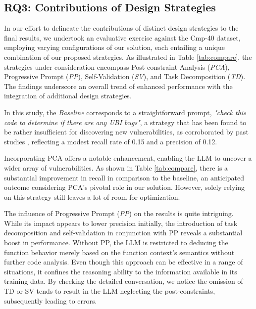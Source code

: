 \subsection{RQ3: Contributions of Design Strategies}
\label{sec:comparison}

In our effort to delineate the contributions of distinct design strategies to the final results, we undertook an evaluative exercise against the Cmp-40 dataset, employing varying configurations of our solution, each entailing a unique combination of our proposed strategies. As illustrated in Table \ref{tab:compare}, the strategies under consideration encompass Post-constraint Analysis (\textit{PCA}), Progressive Prompt (\textit{PP}), Self-Validation (\textit{SV}), and Task Decomposition (\textit{TD}). The findings underscore an overall trend of enhanced performance with the integration of additional design strategies.

In this study, the \textit{Baseline} corresponds to a straightforward prompt, \textit{"check this code to determine if there are any UBI bugs"}, a strategy that has been found to be rather insufficient for discovering new vulnerabilities, as corroborated by past studies \cite{openai_2023_gpt_4, ma_scope_2023, tian_is_2023}, reflecting a modest recall rate of 0.15 and a precision of 0.12.


Incorporating PCA offers a notable enhancement, enabling the LLM to uncover a wider array of vulnerabilities. As shown in Table \ref{tab:compare}, there is a substantial improvement in recall in comparison to the baseline, an anticipated outcome considering PCA's pivotal role in our solution. However, solely relying on this strategy still leaves a lot of room for optimization.



The influence of Progressive Prompt (\textit{PP}) on the results is quite intriguing. While its impact appears to lower precision initially, the introduction of task decomposition and self-validation in conjunction with PP reveals a substantial boost in performance. Without PP, the LLM is restricted to deducing the function behavior merely based on the function context's semantics without further code analysis. Even though this approach can be effective in a range of situations, it confines the reasoning ability to the information available in its training data. By checking the detailed
conversation, we notice the omission of TD or SV tends to result in the LLM neglecting the post-constraints, subsequently leading to errors.


